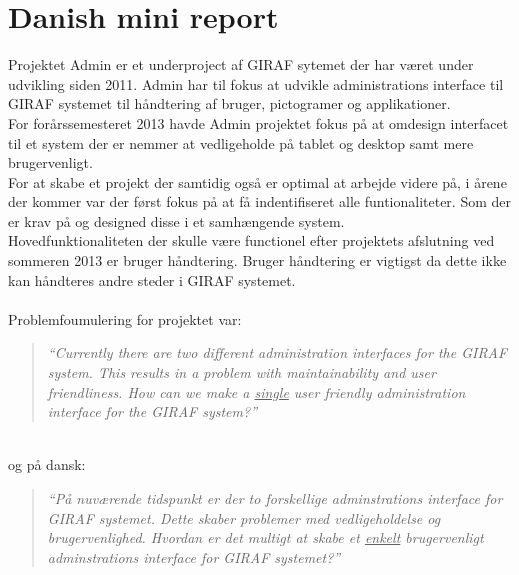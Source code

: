 \chapter{Danish mini report}
Projektet Admin er et underproject af GIRAF sytemet der har været under udvikling siden 2011. Admin har til fokus at udvikle administrations interface til GIRAF systemet til håndtering af bruger, pictogramer og applikationer.\\
For forårssemesteret 2013 havde Admin projektet fokus på at omdesign interfacet til et system der er nemmer at vedligeholde på tablet og desktop samt mere brugervenligt.\\
For at skabe et projekt der samtidig også er optimal at arbejde videre på, i årene der kommer var der først fokus på at få indentifiseret alle funtionaliteter. Som der er krav på og designed disse i et samhængende system.\\
Hovedfunktionaliteten der skulle være functionel efter projektets afslutning ved sommeren 2013 er bruger håndtering.   
Bruger håndtering er vigtigst da dette ikke kan håndteres andre steder i GIRAF systemet.\\
\\
Problemfoumulering for projektet var: 
\begin{verse}
\textit{``Currently there are two different administration interfaces for the GIRAF system.
This results in a problem with maintainability and user friendliness.
How can we make a \underline{single} user friendly administration interface for the GIRAF system?''}
\end{verse}
\\
og på dansk: 
\begin{verse}
\textit{``På nuværende tidspunkt er der to forskellige adminstrations interface for GIRAF systemet.
Dette skaber problemer med vedligeholdelse og brugervenlighed. 
Hvordan er det multigt at skabe et \underline{enkelt} brugervenligt adminstrations interface for GIRAF systemet?''}
\end{verse}


